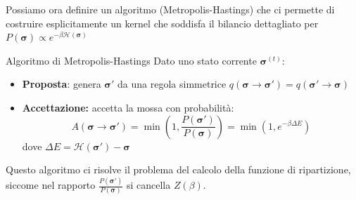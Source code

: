 Possiamo ora definire un algoritmo (Metropolis-Hastings) che ci permette di costruire esplicitamente un kernel che soddisfa il bilancio dettagliato per $P(\mathbf{\sigma}) \propto e^{-\beta \mathcal{H}(\mathbf{\sigma})} $
\begin{boxb}{Algoritmo di Metropolis-Hastings}
Dato uno stato corrente $\mathbf{\sigma}^(t)$:
\begin{itemize}
    \item \textbf{Proposta}: genera $\mathbf{\sigma}'$ da una regola simmetrice $q(\mathbf{\sigma} \to \mathbf{\sigma}')=q(\mathbf{\sigma}' \to \mathbf{\sigma})$
    \item \textbf{Accettazione:} accetta la mossa con probabilità:
\begin{equation}
    A(\mathbf{\sigma} \to \mathbf{\sigma}')=\min\left(1, \frac{P(\mathbf{\sigma}')}{P(\mathbf{\sigma})}\right) =\min \left(1,e^{-\beta \Delta E}\right) 
\end{equation}
dove $\Delta E=\mathcal{H}(\mathbf{\sigma}')-\mathcal{\mathbf{\sigma}}$
\end{itemize}
\end{boxb}
Questo algoritmo ci risolve il problema del calcolo della funzione di ripartizione, siccome nel rapporto $\frac{P(\mathbf{\sigma}')}{P(\mathbf{\sigma})}$ si cancella $Z(\beta)$.\\

